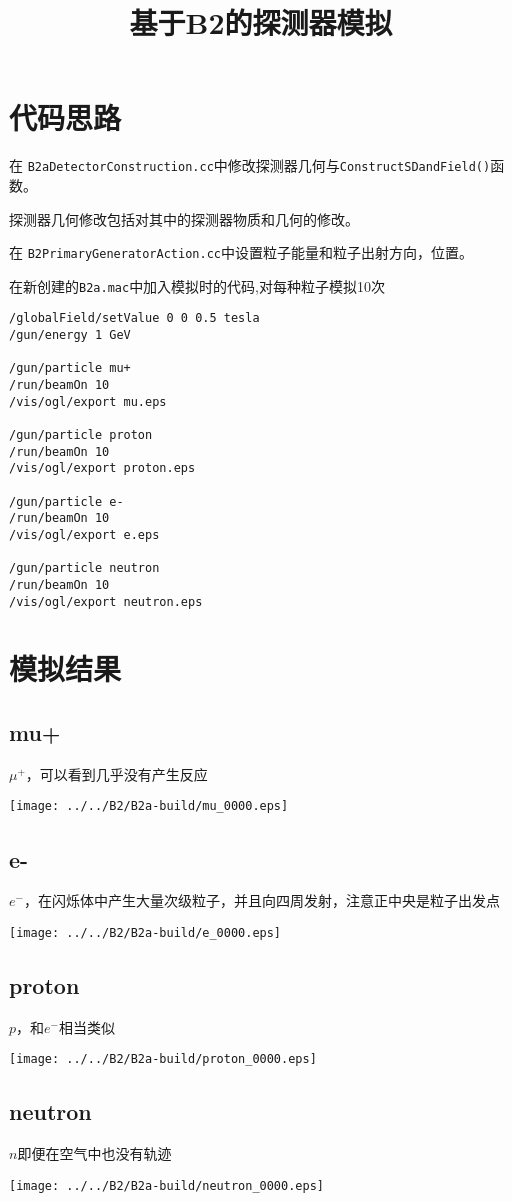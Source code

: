 \documentclass[UTF-8]{ctexart}
\title{基于B2的探测器模拟}
\begin{document}
\maketitle
\section{代码思路}
在 \texttt{B2aDetectorConstruction.cc}中修改探测器几何与\texttt{ConstructSDandField()}函数。

探测器几何修改包括对其中的探测器物质和几何的修改。

在 \texttt{B2PrimaryGeneratorAction.cc}中设置粒子能量和粒子出射方向，位置。

在新创建的\texttt{B2a.mac}中加入模拟时的代码,对每种粒子模拟10次

\begin{verbatim}
/globalField/setValue 0 0 0.5 tesla
/gun/energy 1 GeV

/gun/particle mu+
/run/beamOn 10
/vis/ogl/export mu.eps

/gun/particle proton
/run/beamOn 10
/vis/ogl/export proton.eps

/gun/particle e-
/run/beamOn 10
/vis/ogl/export e.eps

/gun/particle neutron
/run/beamOn 10
/vis/ogl/export neutron.eps
\end{verbatim}
\section{模拟结果}
\subsection{mu+}
$\mu^+$，可以看到几乎没有产生反应

    \texttt{[image: ../../B2/B2a-build/mu\_0000.eps]}
\subsection{e-}
$e^-$，在闪烁体中产生大量次级粒子，并且向四周发射，注意正中央是粒子出发点

\texttt{[image: ../../B2/B2a-build/e\_0000.eps]}
\subsection{proton}
$p$，和$e^-$相当类似

\texttt{[image: ../../B2/B2a-build/proton\_0000.eps]}
\subsection{neutron}
$n$即便在空气中也没有轨迹

    \texttt{[image: ../../B2/B2a-build/neutron\_0000.eps]}
\end{document}
